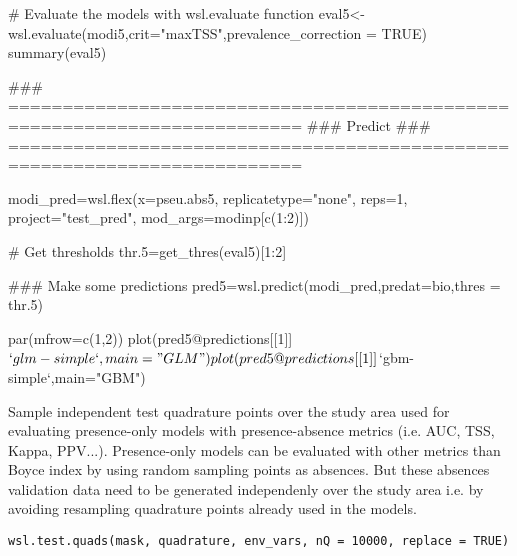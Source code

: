 \documentclass[a4paper]{book}
\begin{document}
\begin{Examples}
\begin{ExampleCode}
# Evaluate the models with wsl.evaluate function
eval5<-wsl.evaluate(modi5,crit="maxTSS",prevalence_correction = TRUE)
summary(eval5)

### =========================================================================
### Predict
### =========================================================================

modi_pred=wsl.flex(x=pseu.abs5,
                  replicatetype="none",
                  reps=1,
                  project="test_pred",
                  mod_args=modinp[c(1:2)])

# Get thresholds
thr.5=get_thres(eval5)[1:2]

### Make some predictions
pred5=wsl.predict(modi_pred,predat=bio,thres = thr.5)

par(mfrow=c(1,2))
plot(pred5@predictions[[1]]$`glm-simple`,main="GLM")
plot(pred5@predictions[[1]]$`gbm-simple`,main="GBM")

\end{ExampleCode}
\end{Examples}
%
\begin{Description}\relax
Sample independent test quadrature points over the study area used for evaluating presence-only
models with presence-absence metrics (i.e. AUC, TSS, Kappa, PPV...). Presence-only models can
be evaluated with other metrics than Boyce index by using random sampling points as absences.
But these absences validation data need to be generated independenly over the study area i.e.
by avoiding resampling quadrature points already used in the models.
\end{Description}
%
\begin{Usage}
\begin{verbatim}
wsl.test.quads(mask, quadrature, env_vars, nQ = 10000, replace = TRUE)
\end{verbatim}
\end{Usage}
%
\end{document}
